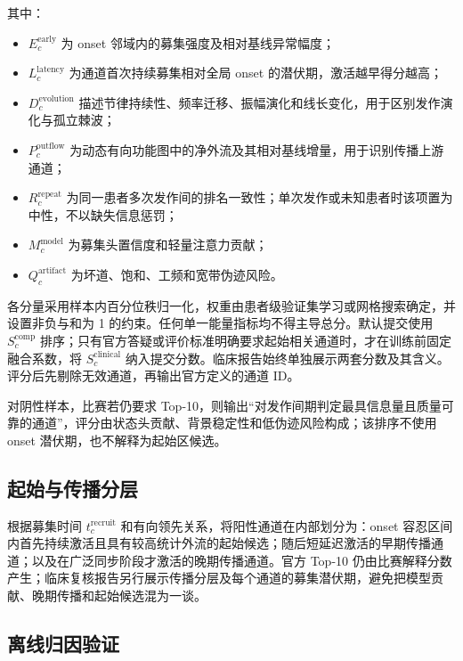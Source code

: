 其中：

\begin{itemize}[leftmargin=2em,itemsep=0.2em]
    \item $E_c^{\mathrm{early}}$ 为 onset 邻域内的募集强度及相对基线异常幅度；
    \item $L_c^{\mathrm{latency}}$ 为通道首次持续募集相对全局 onset 的潜伏期，激活越早得分越高；
    \item $D_c^{\mathrm{evolution}}$ 描述节律持续性、频率迁移、振幅演化和线长变化，用于区别发作演化与孤立棘波；
    \item $P_c^{\mathrm{outflow}}$ 为动态有向功能图中的净外流及其相对基线增量，用于识别传播上游通道；
    \item $R_c^{\mathrm{repeat}}$ 为同一患者多次发作间的排名一致性；单次发作或未知患者时该项置为中性，不以缺失信息惩罚；
    \item $M_c^{\mathrm{model}}$ 为募集头置信度和轻量注意力贡献；
    \item $Q_c^{\mathrm{artifact}}$ 为坏道、饱和、工频和宽带伪迹风险。
\end{itemize}

各分量采用样本内百分位秩归一化，权重由患者级验证集学习或网格搜索确定，并设置非负与和为 1 的约束。任何单一能量指标均不得主导总分。默认提交使用 $S_c^{\mathrm{comp}}$ 排序；只有官方答疑或评价标准明确要求起始相关通道时，才在训练前固定融合系数，将 $S_c^{\mathrm{clinical}}$ 纳入提交分数。临床报告始终单独展示两套分数及其含义。评分后先剔除无效通道，再输出官方定义的通道 ID。

对阴性样本，比赛若仍要求 Top-10，则输出“对发作间期判定最具信息量且质量可靠的通道”，评分由状态头贡献、背景稳定性和低伪迹风险构成；该排序不使用 onset 潜伏期，也不解释为起始区候选。

\subsection{起始与传播分层}

根据募集时间 $t_c^{\mathrm{recruit}}$ 和有向领先关系，将阳性通道在内部划分为：onset 容忍区间内首先持续激活且具有较高统计外流的起始候选；随后短延迟激活的早期传播通道；以及在广泛同步阶段才激活的晚期传播通道。官方 Top-10 仍由比赛解释分数产生；临床复核报告另行展示传播分层及每个通道的募集潜伏期，避免把模型贡献、晚期传播和起始候选混为一谈。

\subsection{离线归因验证}

